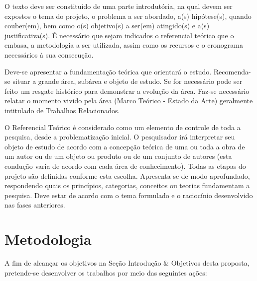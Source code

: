 \documentclass[
	12pt,				%
	openright,			%
	oneside,
	a4paper,			%
	english,			%
	french,				%
	spanish,			%
	brazil,				%
	]{abntex2}
\begin{document}
\begin{citacao}
O texto deve ser constituído de uma parte introdutória, na qual devem ser
expostos o tema do projeto, o problema a ser abordado, a(s) hipótese(s),
quando couber(em), bem como o(s) objetivo(s) a ser(em) atingido(s) e a(s)
justificativa(s). É necessário que sejam indicados o referencial teórico que
o embasa, a metodologia a ser utilizada, assim como os recursos e o cronograma
necessários à sua consecução.
\end{citacao}

Deve-se apresentar a fundamentação teórica que orientará o estudo. Recomenda-se situar a grande área, subárea e objeto de estudo. Se for necessário pode ser feito um resgate histórico para demonstrar a evolução da área. Faz-se necessário relatar o momento vivido pela área (Marco Teórico - Estado da Arte) geralmente intitulado de Trabalhos Relacionados.

O Referencial Teórico é considerado como um elemento de controle de toda a pesquisa, desde a problematização inicial. O pesquisador irá interpretar seu objeto de estudo de acordo com a concepção teórica de uma ou toda a obra de um autor ou de um objeto ou produto ou de um conjunto de autores (esta condução varia de acordo com cada área de conhecimento). Todas as etapas do projeto são definidas conforme esta escolha. Apresenta-se de modo aprofundado, respondendo quais os princípios, categorias, conceitos ou teorias fundamentam a pesquisa. Deve estar de acordo com o tema formulado e o raciocínio desenvolvido nas fases anteriores. 



\chapter{Metodologia}

 A fim de alcançar os objetivos na Seção Introdução \& Objetivos desta proposta, pretende-se desenvolver os trabalhos por meio das seguintes ações: 
\end{document}
